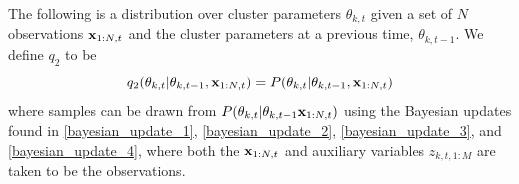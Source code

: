 \documentclass[twocolumn, final]{svjour3}
\begin{document}
The following is a distribution over cluster parameters $\theta_{k,t}$ given a set of $N$ observations $\bold{x}_{1:N, t}$ and the cluster parameters at a previous time, $\theta_{k,t-1}$. We define $q_{2}$ to be
\begin{equation}
\label{smc_q2_eqn}
q_{2}(\theta_{k,t} | \theta_{k,t-1}, \bold{x}_{1:N,t}) = P(\theta_{k,t} | \theta_{k,t-1}, \bold{x}_{1:N,t})
\end{equation}
where samples can be drawn from $P(\theta_{k,t} | \theta_{k,t-1} \bold{x}_{1:N,t})$ using the Bayesian updates found in \eqref{bayesian_update_1}, \eqref{bayesian_update_2}, \eqref{bayesian_update_3}, and \eqref{bayesian_update_4}, where both the $\bold{x}_{1:N,t}$ and auxiliary variables $z_{k,t,1:M}$ are taken to be the observations.


\end{document}
